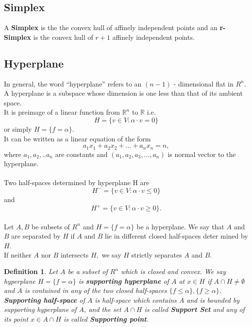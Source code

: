 \documentclass[oneside]{book}
\newtheorem{mydef}{Definition}[section]
\begin{document}
	
	\subsection{Simplex} 
	\label{ss:8}
	A \textbf{Simplex} is the the convex hull of affinely independent points and  an \newline 
	\textbf{r-Simplex} is the convex hull of $r+ 1$ affinely independent points.
	
	
	
	
	
	
	
	
	
	\subsection{Hyperplane} 
	\label{ss:9}
	In general, the word “hyperplane” refers to an $( n-1 )$ - dimensional flat in $R^{n}$. \\
	A hyperplane is a subspace whose dimension is one less than that of its ambient space.  
	\\ It is preimage of a  linear function from $\mathbb{R}^{n}$ to $\mathbb{R}$ i.e.
	\begin{equation}
		H=\{v \in V: \alpha \cdot v=0\} 
	\end{equation}  
	or simply  $H = \{f = \alpha \}$. \\ 
	It can be written as a linear equation of the form
	$$a_1x_1 + a_2x_2 + ... + a_nx_n = n,$$
	where $a_1,a_2,..a_n$ are constants and $(a_1,a_2,a_3,...,a_n)$ is normal vector to the hyperplane.
	\\\\
	Two half-spaces determined by hyperplane H are 
	$$H^{-}=\{v \in V: \alpha \cdot v \leq 0\}$$ and  $$ H^{+}=\{v \in V: \alpha \cdot v \geq 0\}. $$ 
	\\
	Let $A, B$ be subsets of $R^{n}$ and $H=\{f=\alpha\}$ be a hyperplane. We say that $A$ and
	$B$ are separated by $H$ if $A$ and $B$ lie in different closed half-spaces deter
	mined by $H . $  \\
	If neither $A$ nor $B$ intersects $H,$ we say $H$ strictly separates $A$
	and $B .$\\
	
	
	
	
	
	\begin{mydef} \label{d:3}
		Let $A$ be a subset of $R^{n}$ which is closed and convex. We say hyperplane  $H=\{f=\alpha\}$ is \textbf{supporting hyperplane} of $A$ at  $x \in H$  if $A \cap H \neq \emptyset$ and $A$ is contained in any of the two closed half-spaces $\{f \leq \alpha\}, \{f \geq \alpha\}$.
		\\
		
		\textbf{ Supporting half-space} of $A$ is half-space which contains $A$ and is bounded by supporting hyperplane of $A$, and the set $A \cap H$ is called \textbf{Support Set} and any of its point $x \in A \cap H$ is called \textbf{Supporting point}.
	\end{mydef}
	
\end{document}
